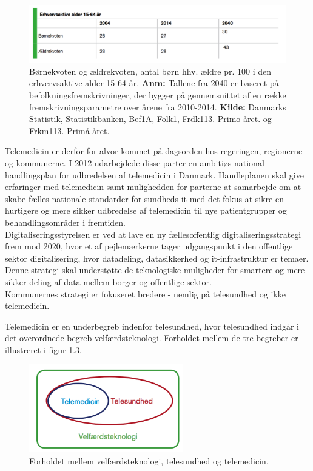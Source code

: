 \begin{figure}[H]
	\centering
	\caption{\cite{KL} Børnekvoten og ældrekvoten, antal børn hhv. ældre pr. 100 i den erhvervsaktive alder 15-64 år. \textbf{Anm:} Tallene fra 2040 er baseret på befolkningsfremskrivninger, der bygger på gennemsnittet af en række fremskrivningsparametre over årene fra 2010-2014. \textbf{Kilde:} Danmarks Statistik, Statistikbanken, Bef1A, Folk1, Frdk113. Primo året. og Frkm113. Primå året.}
	\includegraphics[width=1\textwidth]{Figurer/Snip20160513_6}
\end{figure}    

Telemedicin er derfor for alvor kommet på dagsorden hos regeringen, regionerne og kommunerne. I 2012 udarbejdede disse parter en ambitiøs national handlingsplan for udbredelsen af telemedicin i Danmark\cite{Digst}. Handleplanen skal give erfaringer med telemedicin samt mulighedden for parterne at samarbejde om at skabe fælles nationale standarder for sundheds-it med det fokus at sikre en hurtigere og mere sikker udbredelse af telemedicin til nye patientgrupper og behandlingsområder i fremtiden\cite{NationalH}.\\
Digitaliseringsstyrelsen er ved at lave en ny fællesoffentlig digitaliseringsstrategi frem mod 2020, hvor et af pejlemærkerne tager udgangspunkt i den offentlige sektor digitalisering, hvor datadeling, datasikkerhed og it-infrastruktur er temaer\cite{digst1}. Denne strategi skal understøtte de teknologiske muligheder for smartere og mere sikker deling af data mellem borger og offentlige sektor\cite{digst2}.\\
Kommunernes strategi er fokuseret bredere - nemlig på telesundhed og ikke telemedicin.

Telemedicin er en underbegreb indenfor telesundhed, hvor telesundhed indgår i det overordnede begreb velfærdsteknologi\cite{KLs}. Forholdet mellem de tre begreber er illustreret i figur 1.3. 

\begin{figure}[H]
	\centering
		\caption{Forholdet mellem velfærdsteknologi, telesundhed og telemedicin\cite{KLs}.}
	\includegraphics[width=0.6\textwidth]{Figurer/Snip20160426_6}
\end{figure}



